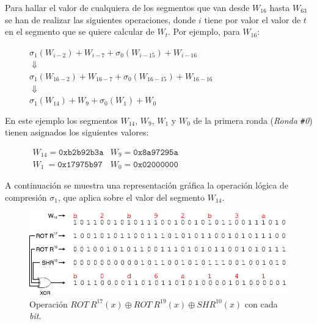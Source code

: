 \documentclass{article}
\begin{document}
        Para hallar el valor de cualquiera de los segmentos que van desde $W_{16}$ hasta $W_{63}$ se han de realizar las siguientes operaciones, donde $i$ tiene por valor el valor de $t$ en el segmento que se quiere calcular de $W_t$. Por ejemplo, para $W_{16}$:
        
        \begin{figure}[H]
        \centering
            $\sigma_{1}(W_{i-2})+W_{i-7}+\sigma_{0}(W_{i-15})+W_{i-16}$ \\
            $\Downarrow$ \\
            $\sigma_{1}(W_{16-2})+W_{16-7}+\sigma_{0}(W_{16-15})+W_{16-16}$ \\
            $\Downarrow$ \\
            $\sigma_{1}(W_{14})+W_{9}+\sigma_{0}(W_{1})+W_{0}$
        \end{figure}
        
        En este ejemplo los segmentos $W_{14}$, $W_{9}$, $W_{1}$ y $W_{0}$ de la primera ronda (\textit{Ronda \texttt{\#}0}) tienen asignados los siguientes valores:
        \begin{figure}[H]
        \centering
            $\begin{array}{rl}
                W_{14} = \texttt{0xb2b92b3a} & W_{9} = \texttt{0x8a97295a} \\
                W_{1}\  = \texttt{0x17975b97} & W_{0} = \texttt{0x02000000}
            \end{array}$
        \end{figure}
        
        A continuación se muestra una representación gráfica la operación lógica de compresión $\sigma_{1}$, que aplica sobre el valor del segmento $W_{14}$.
        
        \begin{figure}[H]
        \centering
            \includegraphics[scale=0.445]{img/SHA-256-Wt_operacion_sigma1.png}
            \caption{Operación $ROT \ R^{17}(x) \oplus ROT \ R^{19}(x) \oplus SHR^{10}(x)$ con cada \textit{bit}.}
        \end{figure}
        
\end{document}
